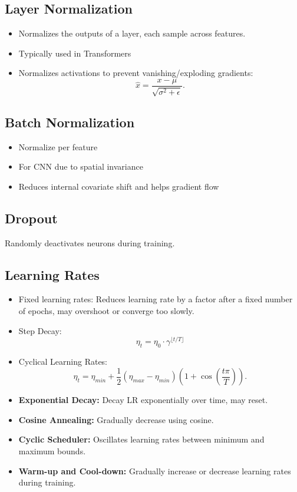 \documentclass[12pt,a4paper]{article}
\begin{document}
\subsection{Layer Normalization}
\begin{itemize}
\item Normalizes the outputs of a layer, each sample across features. 
    \item Typically used in Transformers
    \item Normalizes activations to prevent vanishing/exploding gradients:
    \[ \hat{x} = \frac{x - \mu}{\sqrt{\sigma^2 + \epsilon}}. \]
\end{itemize}
\subsection{Batch Normalization} %
\begin{itemize}
    \item Normalize per  feature
    \item For CNN due to spatial invariance
    \item Reduces internal covariate shift and helps gradient flow 
    
\end{itemize}
\subsection{Dropout}
Randomly deactivates neurons during training.

\subsection{Learning Rates}
\begin{itemize}
    \item Fixed learning rates: Reduces learning rate by a factor after a fixed number of epochs, may overshoot or converge too slowly. 
    \item Step Decay:
    \[ \eta_t = \eta_0 \cdot \gamma^{\lfloor t / T \rfloor} \]
    \item Cyclical Learning Rates:
    \[ \eta_t = \eta_{min} + \frac{1}{2}(\eta_{max} - \eta_{min})(1 + \cos(\frac{t \pi}{T})). \]
    \item \textbf{Exponential Decay:} Decay LR exponentially over time, may reset.
    \item \textbf{Cosine Annealing:} Gradually decrease using cosine.
    \item \textbf{Cyclic Scheduler:} Oscillates learning rates between minimum and maximum bounds.
    \item \textbf{Warm-up and Cool-down:} Gradually increase or decrease learning rates during training.
\end{itemize}
\end{document}
